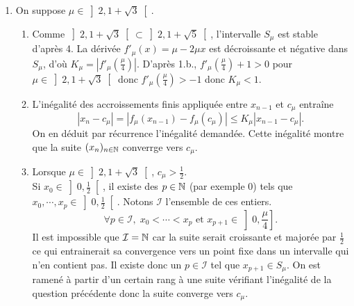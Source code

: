 \begin{enumerate}
\item On suppose $\mu \in \left] 2, 1 + \sqrt{3}\right[$.
\begin{enumerate}
 \item Comme $\left] 2, 1 + \sqrt{3} \right[ \subset \left] 2, 1 + \sqrt{5}\right[$, l'intervalle $S_\mu$ est stable d'après 4. 
La dérivée $f'_\mu(x)=\mu-2\mu x$ est décroissante et négative dans $S_\mu$, d'où $K_\mu = \left\vert f'_\mu(\frac{\mu}{4})\right\vert$.
D'après 1.b., $f'_\mu(\frac{\mu}{4})+1>0$ pour $\mu\in \left] 2,1+\sqrt{3} \right[$ donc $f'_\mu(\frac{\mu}{4})>-1$ donc  $K_\mu <1$.

\item L'inégalité des accroissements finis appliquée entre $x_{n-1}$ et $c_\mu$ entraîne
\begin{displaymath}
 |x_n - c_\mu| = |f_\mu(x_{n-1}) - f_\mu(c_\mu)|\leq K_\mu|x_{n-1}-c_\mu|.
\end{displaymath}
On en déduit par récurrence l'inégalité demandée. Cette inégalité montre que la suite $(x_n)_{n \in \mathbb{N}}$ converrge vers $c_\mu$.

\item Lorsque $\mu\in \left] 2,1+\sqrt{3} \right[$, $c_\mu >\frac{1}{2}$.\\
 Si $x_0 \in \left] 0,\frac{1}{2} \right[$, il existe des $p\in \mathbb{N}$ (par exemple $0$) tels que $x_0, \cdots, x_p\in \left]0,\frac{1}{2} \right[$. 
Notons $\mathcal I$ l'ensemble de ces entiers.
\begin{displaymath}
\forall p\in \mathcal I,\; x_0 < \cdots < x_p \text{ et } x_{p+1} \in \left]0,\frac{\mu}{4} \right].
\end{displaymath}
Il est impossible que $\mathcal I = \mathbb{N}$ car la suite serait croissante et majorée par $\frac{1}{2}$ ce qui entrainerait sa convergence vers un point fixe dans un intervalle qui n'en contient pas. Il existe donc un $p\in \mathcal I$  tel que $x_{p+1}\in S_\mu$. \newline
On est ramené à partir d'un certain rang à une suite vérifiant l'inégalité de la question précédente donc la suite converge vers $c_\mu$.
\end{enumerate}
\end{enumerate}

